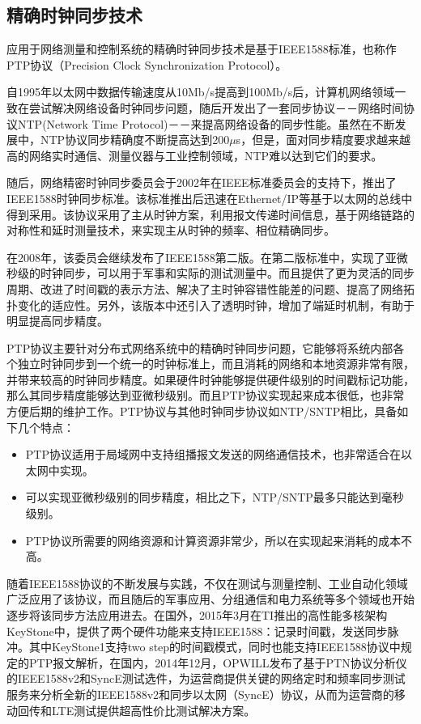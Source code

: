 \subsection{精确时钟同步技术}
应用于网络测量和控制系统的精确时钟同步技术是基于IEEE1588标准，也称作PTP协议（Precision Clock Synchronization Protocol）。

自1995年以太网中数据传输速度从10Mb/s提高到100Mb/s后，计算机网络领域一致在尝试解决网络设备时钟同步问题，随后开发出了一套同步协议－－网络时间协议NTP(Network Time Protocol)－－来提高网络设备的同步性能。虽然在不断发展中，NTP协议同步精确度不断提高达到200$\mu$s，但是，面对同步精度要求越来越高的网络实时通信、测量仪器与工业控制领域，NTP难以达到它们的要求。

随后，网络精密时钟同步委员会于2002年在IEEE标准委员会的支持下，推出了IEEE1588时钟同步标准。该标准推出后迅速在Ethernet/IP等基于以太网的总线中得到采用。该协议采用了主从时钟方案，利用报文传递时间信息，基于网络链路的对称性和延时测量技术，来实现主从时钟的频率、相位精确同步。

在2008年，该委员会继续发布了IEEE1588第二版。在第二版标准中，实现了亚微秒级的时钟同步，可以用于军事和实际的测试测量中。而且提供了更为灵活的同步周期、改进了时间戳的表示方法、解决了主时钟容错性能差的问题、提高了网络拓扑变化的适应性。另外，该版本中还引入了透明时钟，增加了端延时机制，有助于明显提高同步精度。

PTP协议主要针对分布式网络系统中的精确时钟同步问题，它能够将系统内部各个独立时钟同步到一个统一的时钟标准上，而且消耗的网络和本地资源非常有限，并带来较高的时钟同步精度。如果硬件时钟能够提供硬件级别的时间戳标记功能，那么其同步精度能够达到亚微秒级别。而且PTP协议实现起来成本很低，也非常方便后期的维护工作。PTP协议与其他时钟同步协议如NTP/SNTP相比，具备如下几个特点\supercite{4}：
\begin{itemize}[noitemsep,topsep=0pt,parsep=0pt,partopsep=0pt]
	\item PTP协议适用于局域网中支持组播报文发送的网络通信技术，也非常适合在以太网中实现。
	\item 可以实现亚微秒级别的同步精度，相比之下，NTP/SNTP最多只能达到毫秒级别。
	\item PTP协议所需要的网络资源和计算资源非常少，所以在实现起来消耗的成本不高。
\end{itemize}

随着IEEE1588协议的不断发展与实践，不仅在测试与测量控制、工业自动化领域广泛应用了该协议，而且随后的军事应用、分组通信和电力系统等多个领域也开始逐步将该同步方法应用进去。在国外，2015年3月在TI推出的高性能多核架构KeyStone中\supercite{5}，提供了两个硬件功能来支持IEEE1588：记录时间戳，发送同步脉冲。其中KeyStone1支持two step的时间戳模式，同时也能支持IEEE1588协议中规定的PTP报文解析，在国内，2014年12月，OPWILL发布了基于PTN协议分析仪的IEEE1588v2和SyncE测试选件，为运营商提供关键的网络定时和频率同步测试服务来分析全新的IEEE1588v2和同步以太网（SyncE）协议，从而为运营商的移动回传和LTE测试提供超高性价比测试解决方案。

